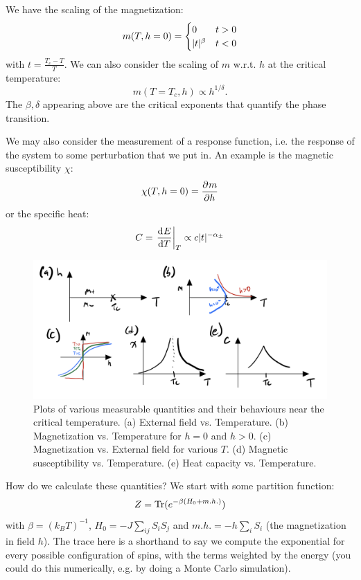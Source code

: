 We have the scaling of the magnetization:
\begin{equation}
    m(T, h=0) = \begin{cases}
        0 & t > 0
        \\ \lvert t \rvert^\beta & t < 0
    \end{cases}
\end{equation}
with $t = \frac{T_c - T}{T}$. We can also consider the scaling of $m$ w.r.t. $h$ at the critical temperature:
\begin{equation}
    m(T = T_c, h) \propto h^{1/\delta}.
\end{equation}
The $\beta, \delta$ appearing above are the critical exponents that quantify the phase transition.

We may also consider the measurement of a response function, i.e. the response of the system to some perturbation that we put in. An example is the magnetic susceptibility $\chi$:
\begin{equation}
    \chi(T, h =0) = \dpd{m}{h}
\end{equation}
or the specific heat:
\begin{equation}
    C = \left.\dod{E}{T}\right|_T \propto c \abs{t}^{-\alpha_\pm}
\end{equation}

\begin{figure}
    \centering
    \includegraphics[scale=0.5]{Lectures/Figures/Various_plots.png}
    \caption{Plots of various measurable quantities and their behaviours near the critical temperature. (a) External field vs. Temperature. (b) Magnetization vs. Temperature for $h = 0$ and $h > 0$. (c) Magnetization vs. External field for various $T$. (d) Magnetic susceptibility vs. Temperature. (e) Heat capacity vs. Temperature.}
    \label{<label>}
\end{figure}

How do we calculate these quantities? We start with some partition function:
\begin{equation}
    Z = \mathrm{Tr} (e^{-\beta(H_0 + m.h.)})
\end{equation}
with $\beta = (k_B T)^{-1}$, $H_0 = -J\sum_{ij}S_iS_j$ and $m.h. = -h\sum_i S_i$ (the magnetization in field $h$). The trace here is a shorthand to say we compute the exponential for every possible configuration of spins, with the terms weighted by the energy (you could do this numerically, e.g. by doing a Monte Carlo simulation).

